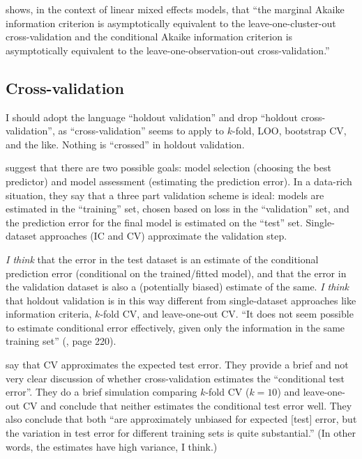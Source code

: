 \textcite{fang2011asymptotic} shows, in the context of linear mixed effects models, that ``the marginal Akaike information criterion is asymptotically equivalent to the leave-one-cluster-out cross-validation and the conditional Akaike information criterion is asymptotically equivalent to the leave-one-observation-out cross-validation.''


\subsection{Cross-validation}

I should adopt the language ``holdout validation'' and drop ``holdout cross-validation'', as ``cross-validation'' seems to apply to $k$-fold, LOO, bootstrap CV, and the like. Nothing is ``crossed'' in holdout validation.

\textcite{Hastie2009} suggest that there are two possible goals: model selection (choosing the best predictor) and model assessment (estimating the prediction error). In a data-rich situation, they say that a three part validation scheme is ideal: models are estimated in the ``training'' set, chosen based on loss in the ``validation'' set, and the prediction error for the final model is estimated on the ``test'' set. Single-dataset approaches (IC and CV) approximate the validation step.

\emph{I think} that the error in the test dataset is an estimate of the conditional prediction error (conditional on the trained/fitted model), and that the error in the validation dataset is also a (potentially biased) estimate of the same. \emph{I think} that holdout validation is in this way different from single-dataset approaches like information criteria, $k$-fold CV, and leave-one-out CV. ``It does not seem possible to estimate conditional error effectively, given only the information in the same training set'' (\cite{Hastie2009}, page 220).

\textcite{Hastie2009} say that CV approximates the expected test error. They provide a brief and not very clear discussion of whether cross-validation estimates the ``conditional test error''. They do a brief simulation comparing $k$-fold CV ($k=10$) and leave-one-out CV and conclude that neither estimates the conditional test error well. They also conclude that both ``are approximately unbiased for expected [test] error, but the variation in test error for different training sets is quite substantial.'' (In other words, the estimates have high variance, I think.)

